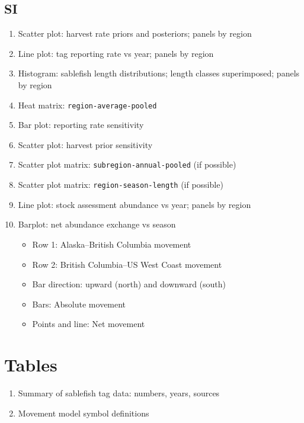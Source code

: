 \documentclass{article}
\begin{document}
\subsection{SI}
\begin{enumerate}
    \item Scatter plot: harvest rate priors and posteriors; panels by region
    \item Line plot: tag reporting rate vs year; panels by region
    \item Histogram: sablefish length distributions; length classes superimposed; panels by region
    \item Heat matrix: \texttt{region-average-pooled}
    \item Bar plot: reporting rate sensitivity
    \item Scatter plot: harvest prior sensitivity
    \item Scatter plot matrix: \texttt{subregion-annual-pooled} (if possible)
    \item Scatter plot matrix: \texttt{region-season-length} (if possible)
    \item Line plot: stock assessment abundance vs year; panels by region
    \item Barplot: net abundance exchange vs season
    \begin{itemize}
        \item Row 1: Alaska--British Columbia movement
        \item Row 2: British Columbia--US West Coast movement
        \item Bar direction: upward (north) and downward (south)
        \item Bars: Absolute movement
        \item Points and line: Net movement
    \end{itemize}

\end{enumerate}

\section{Tables}
\begin{enumerate}
    \item Summary of sablefish tag data: numbers, years, sources
    \item Movement model symbol definitions
\end{enumerate}


\newpage
\vspace{20mm}
\end{document}
